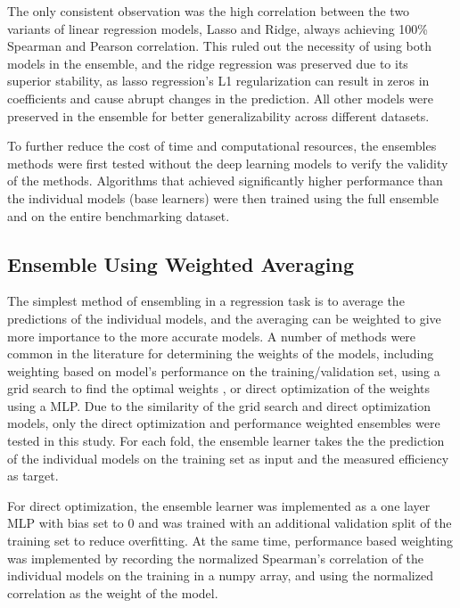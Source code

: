 The only consistent observation was the high correlation between the two variants of linear regression models, Lasso and Ridge, always achieving 100\% Spearman and Pearson correlation. This ruled out the necessity of using both models in the ensemble, and the ridge regression was preserved due to its superior stability, as lasso regression's L1 regularization can result in zeros in coefficients and cause abrupt changes in the prediction. All other models were preserved in the ensemble for better generalizability across different datasets.

To further reduce the cost of time and computational resources, the ensembles methods were first tested without the deep learning models to verify the validity of the methods. Algorithms that achieved significantly higher performance than the individual models (base learners) were then trained using the full ensemble and on the entire benchmarking dataset.

\subsection{Ensemble Using Weighted Averaging}

The simplest method of ensembling in a regression task is to average the predictions of the individual models, and the averaging can be weighted to give more importance to the more accurate models. A number of methods were common in the literature for determining the weights of the models, including weighting based on model's performance on the training/validation set\cite{fathiImprovingPrecipitationForecasts2019}, using a grid search to find the optimal weights \cite{anandWeightedAverageEnsemble2023}, or direct optimization of the weights using a MLP. Due to the similarity of the grid search and direct optimization models, only the direct optimization and performance weighted ensembles were tested in this study. For each fold, the ensemble learner takes the the prediction of the individual models on the training set as input and the measured efficiency as target. 

For direct optimization, the ensemble learner was implemented as a one layer MLP with bias set to 0 and was trained with an additional validation split of the training set to reduce overfitting. At the same time, performance based weighting was implemented by recording the normalized Spearman's correlation of the individual models on the training in a numpy array, and using the normalized correlation as the weight of the model.


